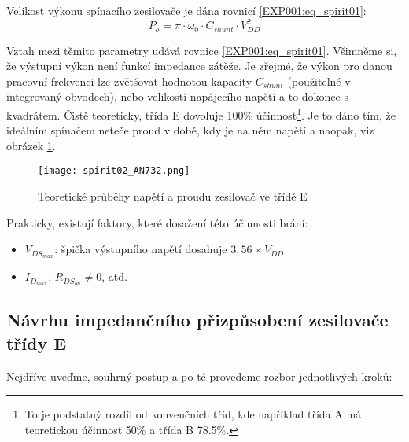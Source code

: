      Velikost výkonu spínacího zesilovače je dána rovnicí \ref{EXP001:eq_spirit01}:
      \begin{equation}\label{EXP001:eq_spirit01}
        P_o = \pi\cdot\omega_0\cdot C_{shunt}\cdot V_{DD}^2
      \end{equation}

      Vztah mezi těmito parametry udává rovnice \ref{EXP001:eq_spirit01}. Všimněme si, že výstupní
      výkon není funkcí impedance zátěže. Je zřejmé, že výkon pro danou pracovní frekvenci lze
      zvětšovat hodnotou kapacity \(C_{shunt}\) (použitelné v integrovaný obvodech), nebo velikostí
      napájecího napětí a to dokonce s kvadrátem.  Čistě teoreticky, třída E dovoluje 100\%
      účinnost\footnote{To je podstatný rozdíl od konvenčních  tříd, kde například třída A má
      teoretickou účinnost 50\% a třída B 78.5\%.}. Je to dáno tím, že ideálním spínačem neteče
      proud v době, kdy je na něm napětí a naopak, viz obrázek  \ref{EXP001:fig_spirit02}.
      
      \begin{figure}[ht!]  %
        \centering
        \texttt{[image: spirit02\_AN732.png]}
        \caption{Teoretické průběhy napětí a proudu zesilovač ve třídě E 
                 \cite[s.~10]{AN648SiliconLabs}}
        \label{EXP001:fig_spirit02}
      \end{figure} 
      
      Prakticky, existují faktory, které dosažení této účinnosti brání: 
      \begin{itemize}[noitemsep]
        \item \(V_{DS_{max}}\): špička výstupního napětí dosahuje \(3,56 \times V_{DD}\) 
        \item \(I_{D_{max}}\), \(R_{DS_{on}} \neq 0\), atd.
      \end{itemize}

    \subsection{Návrhu impedančního přizpůsobení zesilovače třídy E} %
      Nejdříve uveďme, souhrný postup a po té provedeme rozbor jednotlivých kroků:
      
